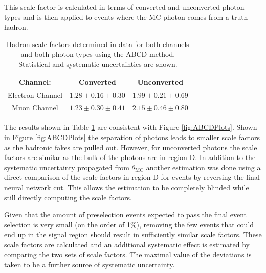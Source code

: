 This scale factor is calculated in terms of converted and unconverted photon types and is then applied to events where the MC photon comes from a truth hadron.


\begin{table}[h]
\begin{center}
{\renewcommand{\arraystretch}{1.2}
\begin{tabular}{c|c|c}
\hline
Channel:     & Converted& Unconverted  \\  \hline 
Electron Channel  & $1.28\pm 0.16 \pm 0.30$     &   $1.99\pm 0.21 \pm 0.69$	\\ 
Muon Channel        & $1.23 \pm 0.30 \pm 0.41$   &   $2.15 \pm 0.46 \pm 0.80$\\ \hline %
\end{tabular}
\caption{Hadron scale factors determined in data for both channels and both photon types using the ABCD method.  Statistical and systematic uncertainties are shown. }
\label{tab:abcdSF}
}
\end{center}
\end{table}

The results shown in Table \ref{tab:abcdSF} are consistent with Figure \ref{fig:ABCDPlots}.  Shown in Figure \ref{fig:ABCDPlots} the separation of photons leads to smaller scale factors as the hadronic fakes are pulled out.  However, for unconverted photons the scale factors are similar as the bulk of the photons are in region D.  In addition to the systematic uncertainty propagated from $\theta_\text{MC}$ another estimation was done using a direct comparison of the scale factors in region D for events by reversing the final neural network cut.  This allows the estimation to be completely blinded while still directly computing the scale factors. 

Given that the amount of preselection events expected to pass the final event selection is very small (on the order of 1\%), removing the few events that could end up in the signal region should result in sufficiently similar scale factors.  These scale factors are calculated and an additional systematic effect is estimated by comparing the two sets of scale factors.  The maximal value of the deviations is taken to be a further source of systematic uncertainty. 

